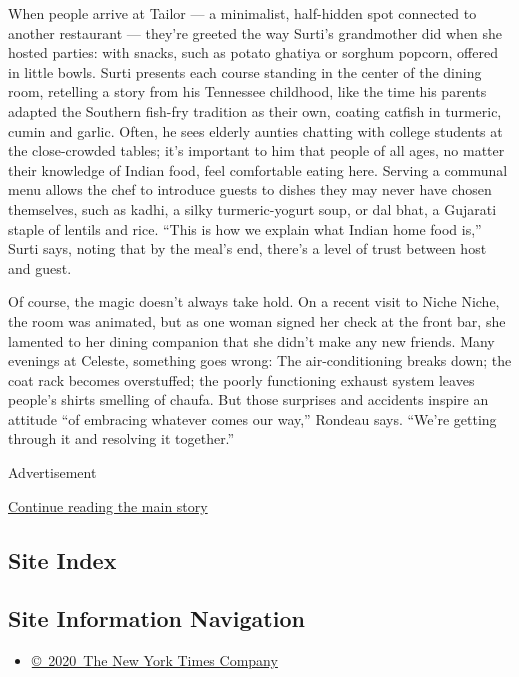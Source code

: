 When people arrive at Tailor --- a minimalist, half-hidden spot
connected to another restaurant --- they're greeted the way Surti's
grandmother did when she hosted parties: with snacks, such as potato
ghatiya or sorghum popcorn, offered in little bowls. Surti presents each
course standing in the center of the dining room, retelling a story from
his Tennessee childhood, like the time his parents adapted the Southern
fish-fry tradition as their own, coating catfish in turmeric, cumin and
garlic. Often, he sees elderly aunties chatting with college students at
the close-crowded tables; it's important to him that people of all ages,
no matter their knowledge of Indian food, feel comfortable eating here.
Serving a communal menu allows the chef to introduce guests to dishes
they may never have chosen themselves, such as kadhi, a silky
turmeric-yogurt soup, or dal bhat, a Gujarati staple of lentils and
rice. ``This is how we explain what Indian home food is,'' Surti says,
noting that by the meal's end, there's a level of trust between host and
guest.

Of course, the magic doesn't always take hold. On a recent visit to
Niche Niche, the room was animated, but as one woman signed her check at
the front bar, she lamented to her dining companion that she didn't make
any new friends. Many evenings at Celeste, something goes wrong: The
air-conditioning breaks down; the coat rack becomes overstuffed; the
poorly functioning exhaust system leaves people's shirts smelling of
chaufa. But those surprises and accidents inspire an attitude ``of
embracing whatever comes our way,'' Rondeau says. ``We're getting
through it and resolving it together.''

Advertisement

\protect\hyperlink{after-bottom}{Continue reading the main story}

\hypertarget{site-index}{%
\subsection{Site Index}\label{site-index}}

\hypertarget{site-information-navigation}{%
\subsection{Site Information
Navigation}\label{site-information-navigation}}

\begin{itemize}
\tightlist
\item
  \href{https://help.nytimes3xbfgragh.onion/hc/en-us/articles/115014792127-Copyright-notice}{©~2020~The
  New York Times Company}
\end{itemize}

